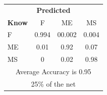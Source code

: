 \documentclass[12pt]{article} %
\begin{document}
\begin{minipage}{0.5\textwidth}
\begin{center}
\begin{tabular}{l|c|c|c|}
 \multicolumn{4}{c}{ \textbf{ Predicted}}\\
 \textbf{Know}&F&ME&MS\\ \hline\hline
F   &0.994&00.002&0.004\\
ME &0.01&0.92&0.07\\
MS &0&0.02&0.98\\
\multicolumn{4}{c}{Average Accuracy is 0.95}\\
\multicolumn{4}{c}{25\%  of the net}\\
\end{tabular}
\end{center}
\end{minipage}
\end{document}

